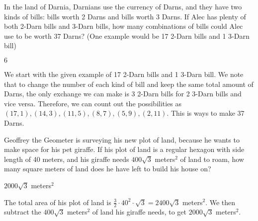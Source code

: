 \documentclass[11pt]{article}
\begin{document}
\begin{problem}
In the land of Darnia, Darnians use the currency of Darns, and they have two kinds of bills: bills worth 2 Darns and bills worth 3 Darns. If Alec has plenty of both 2-Darn bills and 3-Darn bills, how many combinations of bills could Alec use to be worth 37 Darns? (One example would be 17 2-Darn bills and 1 3-Darn bill)
\end{problem}
\begin{answer}
$\boxed{6}$
\end{answer}
\begin{solution} We start with the given example of 17 2-Darn bills and 1 3-Darn bill. We note that to change the number of each kind of bill and keep the same total amount of Darns, the only exchange we can make is 3 2-Darn bills for 2 3-Darn bills and vice versa. Therefore, we can count out the possibilities as $(17, 1), (14, 3), (11, 5), (8, 7), (5, 9), (2, 11)$. This is  ways to make 37 Darns.
\end{solution}

\begin{problem}
Geoffrey the Geometer is surveying his new plot of land, because he wants to make space for his pet giraffe. If his plot of land is a regular hexagon with side length of 40 meters, and his giraffe needs $400\sqrt{3}$ meters$^2$ of land to roam, how many square meters of land does he have left to build his house on?
\end{problem}
\begin{answer}
$\boxed{2000\sqrt{3}}$ meters$^2$
\end{answer}
\begin{solution}
The total area of his plot of land is $\frac{3}{2}\cdot40^2\cdot\sqrt{3} = 2400\sqrt{3}$ meters$^2$. We then subtract the $400\sqrt{3}$ meters$^2$ of land his giraffe needs, to get $\boxed{2000\sqrt{3}}$ meters$^2$.
\end{solution}
\end{document}
